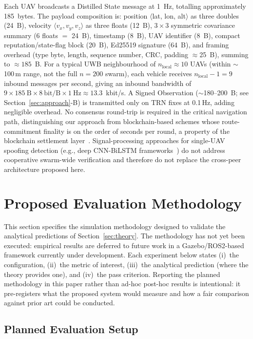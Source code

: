 \documentclass[conference,10pt]{IEEEtran}
\begin{document}
Each UAV broadcasts a Distilled State message at 1~Hz, totalling approximately 185~bytes. The payload composition is: position $\langle$lat, lon, alt$\rangle$ as three doubles (24~B), velocity $\langle v_x, v_y, v_z\rangle$ as three floats (12~B), $3{\times}3$ symmetric covariance summary (6 floats $=$ 24~B), timestamp (8~B), UAV identifier (8~B), compact reputation/state-flag block (20~B), Ed25519 signature (64~B), and framing overhead (type byte, length, sequence number, CRC, padding $\approx$25~B), summing to $\approx 185$~B. For a typical UWB neighbourhood of $n_\text{local}\approx 10$ UAVs (within $\sim$100\,m range, not the full $n=200$ swarm), each vehicle receives $n_\text{local}-1 = 9$ inbound messages per second, giving an inbound bandwidth of $9 \times 185~\text{B} \times 8~\text{bit/B} \times 1~\text{Hz} \approx 13.3$~kbit/s. A Signed Observation ($\sim$180--200~B; see Section~\ref{sec:approach}-B) is transmitted only on TRN fixes at 0.1\,Hz, adding negligible overhead. No consensus round-trip is required in the critical navigation path, distinguishing our approach from blockchain-based schemes whose route-commitment finality is on the order of seconds per round, a property of the blockchain settlement layer~\cite{strobel2020blockchain,strobel2023robot}. Signal-processing approaches for single-UAV spoofing detection (e.g., deep CNN-BiLSTM frameworks~\cite{badar2025deepspoofnet}) do not address cooperative swarm-wide verification and therefore do not replace the cross-peer architecture proposed here.

\section{Proposed Evaluation Methodology}
\label{sec:sim}

This section specifies the simulation methodology designed to validate the analytical predictions of Section~\ref{sec:theory}. The methodology has not yet been executed: empirical results are deferred to future work in a Gazebo/ROS2-based framework currently under development. Each experiment below states (i)~the configuration, (ii)~the metric of interest, (iii)~the analytical prediction (where the theory provides one), and (iv)~the pass criterion. Reporting the planned methodology in this paper rather than ad-hoc post-hoc results is intentional: it pre-registers what the proposed system would measure and how a fair comparison against prior art could be conducted.

\subsection{Planned Evaluation Setup}
\end{document}
